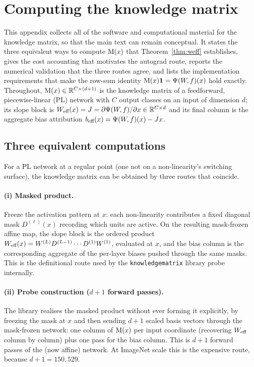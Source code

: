 \section{Computing the knowledge matrix}
\label{app:engineering}

This appendix collects all of the software and computational material for the
knowledge matrix, so that the main text can remain conceptual. It states the
three equivalent ways to compute $\mathrm{M}(x)$ that Theorem~\ref{thm:weff}
establishes, gives the cost accounting that motivates the autograd route,
reports the numerical validation that the three routes agree, and lists the
implementation requirements that make the row-sum identity
$\mathrm{M}(x)\mathbf{1}=\Psi(W\!,f)(x)$ hold exactly. Throughout, $\mathrm{M}(x)\in\mathbb{R}^{C\times(d+1)}$ is
the knowledge matrix of a feedforward, piecewise-linear (PL) network with $C$
output classes on an input of dimension $d$; its slope block is
$W_{\text{eff}}(x)=J=\partial\Psi(W\!,f)/\partial x\in\mathbb{R}^{C\times d}$ and its final column is
the aggregate bias attribution $b_{\text{eff}}(x)=\Psi(W\!,f)(x)-Jx$.

\subsection{Three equivalent computations}
\label{app:eng-three-routes}

For a PL network at a regular point (one not on a non-linearity's switching
surface), the knowledge matrix can be obtained by three routes that coincide.

\paragraph{(i) Masked product.}
Freeze the activation pattern at $x$: each non-linearity contributes a fixed
diagonal mask $D^{(\ell)}(x)$ recording which units are active. On the resulting
mask-frozen affine map, the slope block is the ordered product
$W_{\text{eff}}(x)=W^{(L)}D^{(L-1)}\cdots D^{(1)}W^{(1)}$, evaluated at $x$, and the bias
column is the corresponding aggregate of the per-layer biases pushed through the
same masks. This is the definitional route used by the
\texttt{knowledgematrix} library probe internally.

\paragraph{(ii) Probe construction ($d{+}1$ forward passes).}
The library realises the masked product without ever forming it explicitly, by
freezing the mask at $x$ and then sending $d{+}1$ scaled basis vectors through
the mask-frozen network: one column of $\mathrm{M}(x)$ per input coordinate (recovering
$W_{\text{eff}}$ column by column) plus one pass for the bias column. This is $d{+}1$
forward passes of the (now affine) network. At ImageNet scale this is the
expensive route, because $d{+}1 = 150{,}529$.

